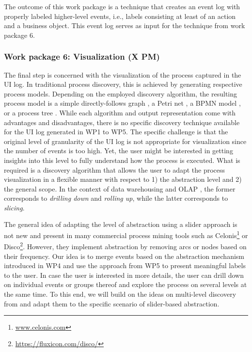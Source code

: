  The outcome of this work package is a technique that creates an event log with properly labeled higher-level events, i.e., labels consisting at least of an action and a business object. This event log serves as input for the technique from work package 6. 

\subsubsection{Work package 6: Visualization (X PM)}
\label{sec:wp6}

The final step is concerned with the visualization of the process captured in the UI log. In traditional process discovery, this is achieved by generating respective process models. Depending on the employed discovery algorithm, the resulting process model is a simple directly-follows graph \cite{van2019practitioner}, a Petri net \cite{van2004workflow}, a BPMN model \cite{conforti2016bpmn}, or a process tree \cite{leemans2013discovering}. While each algorithm and output representation come with advantages and disadvantages, there is no specific discovery technique available for the UI log generated in WP1 to WP5. The specific challenge is that the original level of granularity of the UI log is not appropriate for visualization since the number of events is too high. Yet, the user might be interested in getting insights into this level to fully understand how the process is executed. What is required is a discovery algorithm that allows the user to adapt the process visualization in a flexible manner with respect to 1) the abstraction level and 2) the general scope. In the context of data warehousing and OLAP \cite{chaudhuri1997overview}, the former corresponds to \textit{drilling down} and \textit{rolling up}, while the latter corresponds to \textit{slicing}. 

 The general idea of adapting the level of abstraction using a slider approach is not new and present in many commercial process mining tools such as Celonis\footnote{\url{www.celonis.com}} or Disco\footnote{\url{https://fluxicon.com/disco/}}. However, they implement abstraction by removing arcs or nodes based on their frequency. Our idea is to merge events based on the abstraction mechanism introduced in WP4 and use the approach from WP5 to present meaningful labels to the user. In case the user is interested in more details, the user can drill down on individual events or groups thereof and explore the process on several levels at the same time. To this end, we will build on the ideas on multi-level discovery from \cite{leemans2020using} and adapt them to the specific scenario of slider-based abstraction. 

